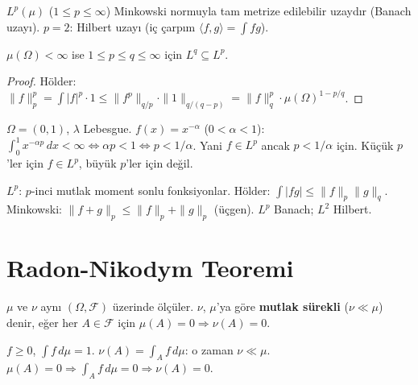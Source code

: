 \begin{teorem}
\label{thm:riesz_fischer}
$L^p(\mu)$ ($1 \leq p \leq \infty$) Minkowski normuyla tam metrize edilebilir uzaydır
(Banach uzayı). $p = 2$: Hilbert uzayı (iç çarpım $\langle f,g\rangle = \int fg$).
\end{teorem}

\begin{teorem}
\label{thm:lp_dahil}
$\mu(\Omega) < \infty$ ise $1 \leq p \leq q \leq \infty$ için $L^q \subseteq L^p$.
\end{teorem}

\begin{proof}
Hölder: $\|f\|_p^p = \int|f|^p \cdot 1 \leq \|f^p\|_{q/p} \cdot \|1\|_{q/(q-p)} = \|f\|_q^p \cdot \mu(\Omega)^{1-p/q}$.
\end{proof}

\begin{ornek}[$L^p$ Farklılıkları]
$\Omega = (0,1)$, $\lambda$ Lebesgue. $f(x) = x^{-\alpha}$ ($0 < \alpha < 1$):
$\int_0^1 x^{-\alpha p} \, dx < \infty \Leftrightarrow \alpha p < 1 \Leftrightarrow p < 1/\alpha$.
Yani $f \in L^p$ ancak $p < 1/\alpha$ için. Küçük $p$'ler için $f \in L^p$, büyük $p$'ler için değil.
\end{ornek}

\begin{mikroozet}
$L^p$: $p$-inci mutlak moment sonlu fonksiyonlar. Hölder: $\int|fg| \leq \|f\|_p\|g\|_q$.
Minkowski: $\|f+g\|_p \leq \|f\|_p + \|g\|_p$ (üçgen). $L^p$ Banach; $L^2$ Hilbert.
\end{mikroozet}

\section{Radon-Nikodym Teoremi}
\label{sec:radon_nikodym}

\begin{tanim}
\label{def:mutlak_sureklilik}
$\mu$ ve $\nu$ aynı $(\Omega, \mathcal{F})$ üzerinde ölçüler.
$\nu$, $\mu$'ya göre \textbf{mutlak sürekli} ($\nu \ll \mu$) denir, eğer
her $A \in \mathcal{F}$ için $\mu(A) = 0 \Rightarrow \nu(A) = 0$.
\end{tanim}

\begin{ornek}
$f \geq 0$, $\int f \, d\mu = 1$. $\nu(A) = \int_A f \, d\mu$: o zaman $\nu \ll \mu$.
$\mu(A) = 0 \Rightarrow \int_A f \, d\mu = 0 \Rightarrow \nu(A) = 0$.
\end{ornek}

